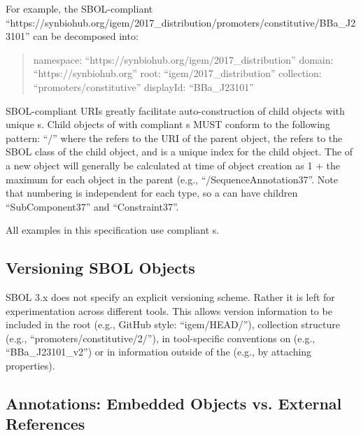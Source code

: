 For example, the SBOL-compliant   ``https://synbiohub.org/igem/2017\_distribution/promoters/constitutive/BBa\_J23101'' can be decomposed into: 
\begin{quote} 
namespace: ``https://synbiohub.org/igem/2017\_distribution'' \linebreak
domain: ``https://synbiohub.org'' \linebreak
root: ``igem/2017\_distribution'' \linebreak
collection: ``promoters/constitutive'' \linebreak
displayId: ``BBa\_J23101'' \linebreak
\end{quote}

SBOL-compliant URIs greatly facilitate auto-construction of child objects with unique s. Child objects of  with compliant s MUST conform to the following pattern: ``/'' where the  refers to the URI of the parent object, the  refers to the SBOL class of the child object, and  is a unique index for the child object. The  of a new object will generally be calculated at time of object creation as 1 + the maximum  for each  object in the parent (e.g., ``/SequenceAnnotation37''. Note that numbering is independent for each type, so a  can have children ``SubComponent37'' and ``Constraint37''.

All examples in this specification use compliant s.

\subsection{Versioning SBOL Objects}
SBOL 3.x does not specify an explicit versioning scheme. Rather it is left for experimentation across different tools. This allows version information to be included in the root (e.g., GitHub style: ``igem/HEAD/''), collection structure (e.g., ``promoters/constitutive/2/''), in tool-specific conventions on  (e.g., ``BBa\_J23101\_v2'') or in information outside of the  (e.g., by attaching  properties).

\subsection{Annotations: Embedded Objects vs. External References}

